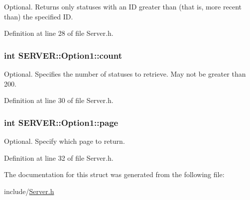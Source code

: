 Optional. Returns only statuses with an ID greater than (that is, more recent than) the specified ID. 



Definition at line 28 of file Server.h.\hypertarget{structSERVER_1_1Option1_20b51548aa06990c9e1f5b5fd8d878e5}{
\subsubsection{\setlength{\rightskip}{0pt plus 5cm}int {\bf SERVER::Option1::count}}}
\label{structSERVER_1_1Option1_20b51548aa06990c9e1f5b5fd8d878e5}


Optional. Specifies the number of statuses to retrieve. May not be greater than 200. 



Definition at line 30 of file Server.h.\hypertarget{structSERVER_1_1Option1_00eb077ba9bbe459a38aea89f1c71426}{
\subsubsection{\setlength{\rightskip}{0pt plus 5cm}int {\bf SERVER::Option1::page}}}
\label{structSERVER_1_1Option1_00eb077ba9bbe459a38aea89f1c71426}


Optional. Specify which page to return. 



Definition at line 32 of file Server.h.

The documentation for this struct was generated from the following file:\begin{CompactItemize}
\item 
include/\hyperlink{Server_8h}{Server.h}\end{CompactItemize}

